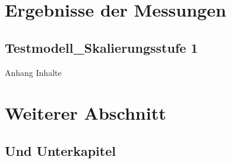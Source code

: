
\section{Ergebnisse der Messungen}
\label{measurementResults}
\subsection{Testmodell\_Skalierungsstufe 1}

Anhang Inhalte

\section{Weiterer Abschnitt}
\label{anotherSection}
\subsection{Und Unterkapitel}
